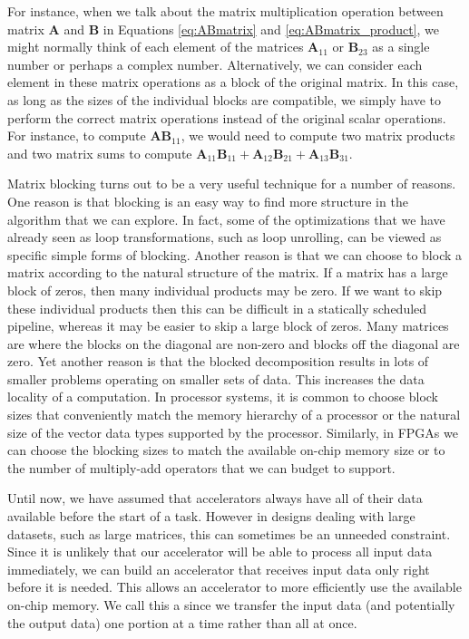 For instance, when we talk about the matrix multiplication operation between matrix $\mathbf{A}$ and $\mathbf{B}$ in Equations \ref{eq:ABmatrix} and \ref{eq:ABmatrix_product}, we might normally think of each element of the matrices $\mathbf{A}_{11}$ or $\mathbf{B}_{23}$ as a single number or perhaps a complex number.  Alternatively, we can consider each element in these matrix operations as a block of the original matrix.  In this case, as long as the sizes of the individual blocks are compatible, we simply have to perform the correct matrix operations instead of the original scalar operations.  For instance, to compute $\mathbf{AB}_{11}$, we would need to compute two matrix products and two matrix sums to compute $\mathbf{A}_{11}\mathbf{B}_{11} + \mathbf{A}_{12}\mathbf{B}_{21} + \mathbf{A}_{13}\mathbf{B}_{31}$.

Matrix blocking turns out to be a very useful technique for a number of reasons.  One reason is that blocking is an easy way to find more structure in the algorithm that we can explore.  In fact, some of the optimizations that we have already seen as loop transformations, such as loop unrolling, can be viewed as specific simple forms of blocking.  Another reason is that we can choose to block a matrix according to the natural structure of the matrix.  If a matrix has a large block of zeros, then many individual products may be zero.  If we want to skip these individual products then this can be difficult in a statically scheduled pipeline, whereas it may be easier to skip a large block of zeros.  Many matrices are  where the blocks on the diagonal are non-zero and blocks off the diagonal are zero.  Yet another reason is that the blocked decomposition results in lots of smaller problems operating on smaller sets of data.  This increases the data locality of a computation.  In processor systems, it is common to choose block sizes that conveniently match the memory hierarchy of a processor or the natural size of the vector data types supported by the processor.  Similarly, in FPGAs we can choose the blocking sizes to match the available on-chip memory size or to the number of multiply-add operators that we can budget to support.

Until now, we have assumed that accelerators always have all of their data available before the start of a task.  However in designs dealing with large datasets, such as large matrices, this can sometimes be an unneeded constraint.  Since it is unlikely that our accelerator will be able to process all input data immediately, we can build an accelerator that receives input data only right before it is needed.  This allows an accelerator to more efficiently use the available on-chip memory.  We call this a  since we transfer the input data (and potentially the output data) one portion at a time rather than all at once.

